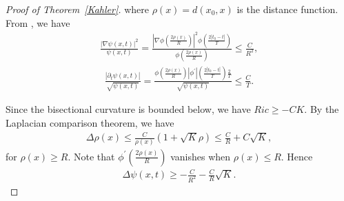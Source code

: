 \documentclass{amsart}
\theoremstyle{definition}
\theoremstyle{remark}
\numberwithin{equation}{section}
\begin{document}
\begin{proof}[Proof of Theorem~\ref{Kahler}]
where $\rho(x)=d(x_0,x)$ is the distance function. From \cite{S-Y}, we have 
\begin{align}\label{gradient estimate c}
\frac{|\nabla \psi(x,t)|^{2}}{\psi(x,t)}=\frac{|\nabla \phi(\frac{2\rho(x)}{R})|^{2}\phi(\frac{2|t_{0}-t|}{T})}{\phi(\frac{2\rho(x)}{R})}\leq \frac{C}{R^{2}}, 
\end{align}
\begin{align}\label{partial t estimate c}
\frac{|\partial_{t}\psi(x,t)|}{\sqrt{\psi(x,t)}}=\frac{\phi(\frac{2\rho(x)}{R})|\phi^{'}|(\frac{2|t_{0}-t|}{T})\frac{2}{T}}{\sqrt{\psi(x,t)}}\leq \frac{C}{T}.
\end{align}

Since the bisectional curvature is bounded below, we have $Ric\geq -CK$. By the Laplacian comparison theorem, we have 
\begin{align*}
\Delta \rho(x)\leq \frac{C}{\rho(x)}(1+\sqrt{K}\rho)\leq \frac{C}{R}+C\sqrt{K},\end{align*}
for $\rho(x)\geq R$.
Note that
$\phi^{'}(\frac{2\rho(x)}{R})$ vanishes when $\rho(x)\leq R$.
Hence 
\begin{align}\label{laplace comparison c}
\Delta \psi(x,t)\geq -\frac{C}{R^{2}}-\frac{C}{R}\sqrt{K}.
\end{align}




\end{proof}
\end{document}

